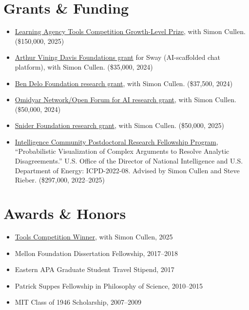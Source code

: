 \documentclass[11pt,letterpaper]{article}
\begin{document}
\section*{Grants \& Funding}
\begin{itemize}
    \item \href{https://tools-competition.org/25-winners-press-release/}{Learning Agency Tools Competition Growth-Level Prize}, with Simon Cullen. (\$150,000, 2025)
    \item \href{https://www.avdf.org/}{Arthur Vining Davis Foundations grant} for Sway (AI-scaffolded chat platform), with Simon Cullen. (\$35,000, 2024)
    \item \href{https://givingpledge.org/pledger?pledgerId=383}{Ben Delo Foundation research grant}, with Simon Cullen. (\$37,500, 2024)
    \item \href{https://www.library.cmu.edu/about/news/2024-07/ofai}{Omidyar Network/Open Forum for AI research grant}, with Simon Cullen. (\$50,000, 2024)
    \item \href{http://www.sniderfoundation.org}{Snider Foundation research grant}, with Simon Cullen. (\$50,000, 2025)
    \item \href{https://orise.orau.gov/icpostdoc/index.html}{Intelligence Community Postdoctoral Research Fellowship Program}, ``Probabilistic Visualization of Complex Arguments to Resolve Analytic Disagreements.'' U.S. Office of the Director of National Intelligence and U.S. Department of Energy: ICPD-2022-08. Advised by Simon Cullen and Steve Rieber. (\$297,000, 2022--2025)
\end{itemize}

\section*{Awards \& Honors}
\begin{itemize}
    \item \href{https://tools-competition.org/25-winners-press-release/}{Tools Competition Winner}, with Simon Cullen, 2025
    \item Mellon Foundation Dissertation Fellowship, 2017--2018
    \item Eastern APA Graduate Student Travel Stipend, 2017
    \item Patrick Suppes Fellowship in Philosophy of Science, 2010--2015
    \item MIT Class of 1946 Scholarship, 2007--2009
\end{itemize}
\end{document}
